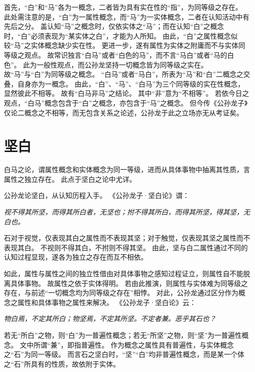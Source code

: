\documentclass[11pt]{article}
\begin{document}
\newline

首先，“白”和“马”各为一概念，二者皆为具有实在性的“指”，为同等级之存在。
此处需注意的是，“白”为一属性概念，而“马”为一实体概念，二者在认知活动中有先后之分。
盖认知“马”之概念时，仅依实体之“马”；而在认知“白”之概念时，“白”必须表现为“某实体之白”，才能为人所知。
由此，“白”之属性概念似较“马”之实体概念缺少实在性。
更进一步，遂有属性为实体之附庸而不与实体同等级之观点。
故常识独言“白马”或者“白色的马”，而不言“马白”或者“马的白色”。
此为一般性观点，而公孙龙坚持一切概念皆为同等级之实在。
故“马”与“白”为同等级之概念。
“白马”或者“马白”，所表为“马”和“白”二概念之交叠，自身亦为一概念。
由此，“白”、“马”、“白马”为三个同等级的实在性概念，显然彼此不相等。
故有“白马非马”之结论。
其中“非”意为“不相等”。
若依今日之观点，“白马”概念包含于“白”之概念，亦包含于“马”之概念。
但今传《公孙龙子》仅论二概念之不相等，而无包含关系之论述，公孙龙于此之立场亦无从考证矣。

\section{坚白}
白马之论，谓属性概念和实体概念为同一等级，进而从具体事物中抽离其性质，言属性之独立存在。
此点于坚白之论中尤详。

\newline

公孙龙论坚白，从认知历程入手。
《公孙龙子·坚白论》谓：

\textit{视不得其所坚，而得其所白者，无坚也；拊不得其所白，而得其所坚，得其坚，无白也。}

石对于视觉，仅表现其白之属性而不表现其坚；对于触觉，仅表现其坚之属性而不表现其白。
不视则不得其白，不拊则不得其坚。
由此，坚与白二属性通过不同的认知过程显现，遂各为独立之存在而互不相依。

\newline

如此，属性与属性之间的独立性借由对具体事物之感知过程证立，则属性自不能脱离具体事物。
故属性之依于实体得明。
若由此推演，则属性与实体难为同等级之存在，与前述“一切概念均为同等级之存在”相悖。
对此，公孙龙通过区分作为概念之属性和具体事物之属性来解决。
《公孙龙子·坚白论》云：

\textit{物白焉，不定其所白；物坚焉，不定其所坚。不定者兼。恶乎其石也？}

若无“所白”之物，则“白”为一普遍性概念；若无“所坚”之物，则“坚”为一普遍性概念。
文中所谓“兼”，即指普遍性。
作为概念之属性具有普遍性，与实体概念之“石”为同一等级。
而言石之坚白时，“坚”“白”均非普遍性概念，而是某一个体之“石”所具有的性质，故依附于实体。
\end{document}
